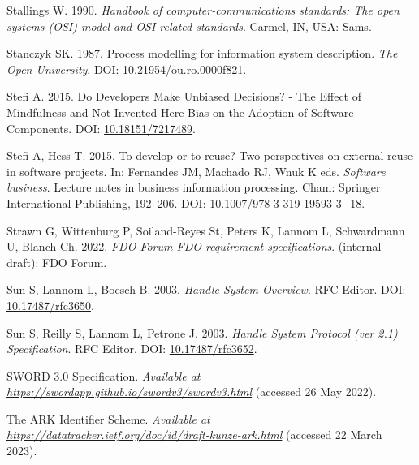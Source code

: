 \begin{CSLReferences}{1}{0}
\leavevmode{}%
Stallings W. 1990. \emph{Handbook of computer-communications standards: The open systems (OSI) model and OSI-related standards}. Carmel, IN, USA: Sams.

\leavevmode{}%
Stanczyk SK. 1987. Process modelling for information system description. \emph{The Open University}. DOI: \href{https://doi.org/10.21954/ou.ro.0000f821}{10.21954/ou.ro.0000f821}.

\leavevmode{}%
Stefi A. 2015. Do Developers Make Unbiased Decisions? - The Effect of Mindfulness and Not-Invented-Here Bias on the Adoption of Software Components. DOI: \href{https://doi.org/10.18151/7217489}{10.18151/7217489}.

\leavevmode{}%
Stefi A, Hess T. 2015. To develop or to reuse? Two perspectives on external reuse in software projects. In: Fernandes JM, Machado RJ, Wnuk K eds. \emph{Software business}. Lecture notes in business information processing. Cham: Springer International Publishing, 192--206. DOI: \href{https://doi.org/10.1007/978-3-319-19593-3_18}{10.1007/978-3-319-19593-3\_18}.

\leavevmode{}%
Strawn G, Wittenburg P, Soiland-Reyes St, Peters K, Lannom L, Schwardmann U, Blanch Ch. 2022. \emph{\href{https://docs.google.com/document/d/1aGA-TBr4XpORhMPtnf_--Nb4FYJccgeSvGmGh68jNws/edit}{FDO Forum FDO requirement specifications}}. (internal draft): FDO Forum.

\leavevmode{}%
Sun S, Lannom L, Boesch B. 2003. \emph{Handle System Overview}. RFC Editor. DOI: \href{https://doi.org/10.17487/rfc3650}{10.17487/rfc3650}.

\leavevmode{}%
Sun S, Reilly S, Lannom L, Petrone J. 2003. \emph{Handle System Protocol (ver 2.1) Specification}. RFC Editor. DOI: \href{https://doi.org/10.17487/rfc3652}{10.17487/rfc3652}.

\leavevmode{}%
SWORD 3.0 Specification. \emph{Available at} \href{https://swordapp.github.io/swordv3/swordv3.html}{\emph{https://swordapp.github.io/swordv3/swordv3.html}} (accessed 26 May 2022).

\leavevmode{}%
The ARK Identifier Scheme. \emph{Available at} \href{https://datatracker.ietf.org/doc/id/draft-kunze-ark.html}{\emph{https://datatracker.ietf.org/doc/id/draft-kunze-ark.html}} (accessed 22 March 2023).


\end{CSLReferences}
